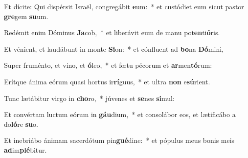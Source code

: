 \item Et dícite: Qui dispérsit Israël, congregábit \textbf{e}um:~* et custódiet eum sicut pastor \textbf{gre}gem \textbf{su}um.
\item Redémit enim Dóminus \textbf{Ja}cob,~* et liberávit eum de manu pot\textbf{en}ti\textbf{ó}ris.
\item Et vénient, et laudábunt in monte \textbf{Si}on:~* et cónfluent ad \textbf{bo}na \textbf{Dó}mini,
\item Super fruménto, et vino, et \textbf{ó}leo,~* et fœtu pécorum et \textbf{ar}men\textbf{tó}rum:
\item Erítque ánima eórum quasi hortus ir\textbf{rí}guus,~* et ultra \textbf{non} e\textbf{sú}rient.
\item Tunc lætábitur virgo in \textbf{cho}ro,~* júvenes et \textbf{se}nes \textbf{si}mul:
\item Et convértam luctum eórum in \textbf{gáu}dium,~* et consolábor eos, et lætificábo a do\textbf{ló}re \textbf{su}o.
\item Et inebriábo ánimam sacerdótum pin\textbf{gué}dine:~* et pópulus meus bonis meis \textbf{ad}im\textbf{plé}bitur.
